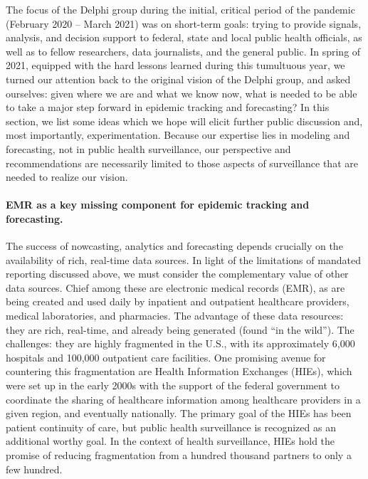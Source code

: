 \documentclass{article}
\begin{document}
The focus of the Delphi group during the initial, critical period of the
pandemic (February 2020 -- March 2021) was on short-term goals: trying to
provide signals, analysis, and decision support to federal, state and local
public health officials, as well as to fellow researchers, data journalists, and
the general public.  In spring of 2021, equipped with the hard lessons learned
during this tumultuous year, we turned our attention back to the original vision
of the Delphi group, and asked ourselves: given where we are and what we know
now, what is needed to be able to take a major step forward in epidemic tracking
and forecasting?  In this section, we list some ideas which we hope will elicit
further public discussion and, most importantly, experimentation. Because our
expertise lies in modeling and forecasting, not in public health surveillance,
our perspective and recommendations are necessarily limited to those aspects of
surveillance that are needed to realize our vision. 

\paragraph{EMR as a key missing component for epidemic tracking and
  forecasting.}  

The success of nowcasting, analytics and forecasting depends crucially on the
availability of rich, real-time data sources.  In light of the limitations of
mandated reporting discussed above, we must consider the complementary value of
other data sources.  Chief among these are electronic medical records (EMR), as
are being created and used daily by inpatient and outpatient healthcare
providers, medical laboratories, and pharmacies.  The advantage of these data
resources: they are rich, real-time, and already being generated (found ``in the
wild'').  The challenges: they are highly fragmented in the U.S., with its
approximately 6,000 hospitals and 100,000 outpatient care facilities.  One
promising avenue for countering this fragmentation are Health Information
Exchanges (HIEs), which were set up in the early 2000s with the support of the
federal government to coordinate the sharing of healthcare information among
healthcare providers in a given region, and eventually nationally.  The primary
goal of the HIEs has been patient continuity of care, but public health
surveillance is recognized as an additional worthy goal.  In the context of
health surveillance, HIEs hold the promise of reducing fragmentation from a
hundred thousand partners to only a few hundred.
\end{document}
